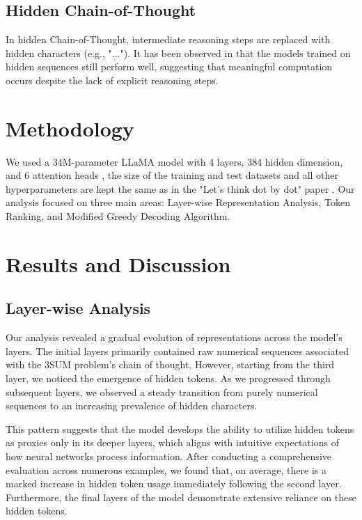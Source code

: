 \documentclass{article}
\begin{document}
\subsection{Hidden Chain-of-Thought}
In hidden Chain-of-Thought, intermediate reasoning steps are replaced with hidden characters (e.g., "..."). It has been observed in \cite{pfau2023let} that the models trained on hidden sequences still perform well, suggesting that meaningful computation occurs despite the lack of explicit reasoning steps.

\section{Methodology}
We used a 34M-parameter LLaMA model with 4 layers, 384 hidden dimension, and 6 attention heads \cite{touvron2023llama}, the size of the training and test datasets and all other hyperparameters are kept the same as in the "Let's think dot by dot" paper \cite{pfau2023let}. Our analysis focused on three main areas: Layer-wise Representation Analysis, Token Ranking, and Modified Greedy Decoding Algorithm.

\section{Results and Discussion}

\subsection{Layer-wise Analysis}
Our analysis revealed a gradual evolution of representations across the model's layers. The initial layers primarily contained raw numerical sequences associated with the 3SUM problem's chain of thought. However, starting from the third layer, we noticed the emergence of hidden tokens. As we progressed through subsequent layers, we observed a steady transition from purely numerical sequences to an increasing prevalence of hidden characters.

This pattern suggests that the model develops the ability to utilize hidden tokens as proxies only in its deeper layers, which aligns with intuitive expectations of how neural networks process information. After conducting a comprehensive evaluation across numerous examples, we found that, on average, there is a marked increase in hidden token usage immediately following the second layer. Furthermore, the final layers of the model demonstrate extensive reliance on these hidden tokens.
\end{document}
